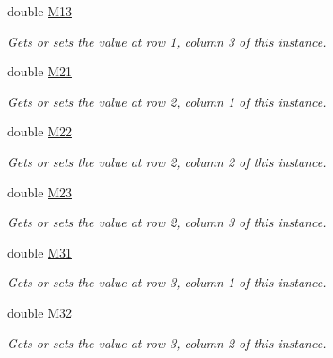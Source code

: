 \begin{DoxyCompactItemize}
double \hyperlink{struct_open_t_k_1_1_matrix4x3d_a41a83bae71564500f7eab8a24eccdd69}{M13}
\begin{DoxyCompactList}\small\item\em Gets or sets the value at row 1, column 3 of this instance. \end{DoxyCompactList}\item 
double \hyperlink{struct_open_t_k_1_1_matrix4x3d_ab69f30f9adac2fd754b6342d7db12f73}{M21}
\begin{DoxyCompactList}\small\item\em Gets or sets the value at row 2, column 1 of this instance. \end{DoxyCompactList}\item 
double \hyperlink{struct_open_t_k_1_1_matrix4x3d_a6fba10110c0e4393ee55ba2b055d0cde}{M22}
\begin{DoxyCompactList}\small\item\em Gets or sets the value at row 2, column 2 of this instance. \end{DoxyCompactList}\item 
double \hyperlink{struct_open_t_k_1_1_matrix4x3d_a617c1df8f6f5915a6eb4174e5e4f4494}{M23}
\begin{DoxyCompactList}\small\item\em Gets or sets the value at row 2, column 3 of this instance. \end{DoxyCompactList}\item 
double \hyperlink{struct_open_t_k_1_1_matrix4x3d_a3dedc4248d817dcffaf98cf89b420ab2}{M31}
\begin{DoxyCompactList}\small\item\em Gets or sets the value at row 3, column 1 of this instance. \end{DoxyCompactList}\item 
double \hyperlink{struct_open_t_k_1_1_matrix4x3d_a6b6c8697fde21502ee283d149f271b13}{M32}
\begin{DoxyCompactList}\small\item\em Gets or sets the value at row 3, column 2 of this instance. \end{DoxyCompactList}\item 

\end{DoxyCompactItemize}
